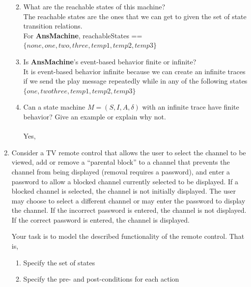 \documentclass{article}
\begin{document}
\begin{enumerate}
\begin{enumerate}
\begin{enumerate}
   \end{enumerate}
 \item What are the reachable states of this machine? \\
   The reachable states are the ones that we can get to given the set of state transition relations. \\
   For {\bf AnsMachine}, reachableStates == $\{none, one, two, three, temp1, temp2, temp3 \}$ \\
\item Is {\bf AnsMachine}'s event-based behavior finite or
  infinite?\\
  It is event-based behavior infinite because
  we can create an infinite traces if we send
  the play message repeatedly while in any of the following states
  $\{one, two three, temp1, temp2, temp3\}$ \\
 \item Can a state machine $M=(S,I,A,\delta)$ with an infinite trace have finite
   behavior? Give an example or explain why not. \\
   \\
   Yes,  \\
\end{enumerate}

\item Consider a TV remote control that allows the user to select
the channel to be viewed, add or remove a ``parental block'' to a
channel that prevents the channel from being displayed (removal
requires a password), and enter a password to allow a blocked
channel currently selected to be displayed. If a blocked channel
is selected, the channel is not initially displayed. The user may
choose to select a different channel or may enter the password to
display the channel. If the incorrect password is entered, the
channel is not displayed. If the correct password is entered, the
channel is displayed.

Your task is to model the described functionality of the remote control. That is,
\begin{enumerate}
\item Specify the set of states

\item Specify the pre- and post-conditions for each action
\end{enumerate}


\end{enumerate}
\end{document}
